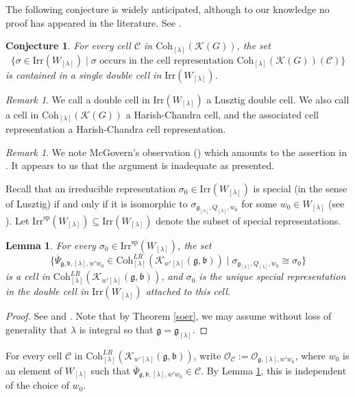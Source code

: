 \documentclass[12pt,a4paper]{amsart}
\def\subset{\subseteq}
\newcommand{\CC}{{\mathcal {C}}}
\newcommand{\CK}{{\mathcal {K}}}
\newcommand{\CO}{{\mathcal {O}}}
\newcommand{\g}{\mathfrak g}
\renewcommand{\b}{\mathfrak b}
\numberwithin{equation}{section}
\newtheorem{lem}[thm]{Lemma}
\newtheorem{conj}[thm]{Conjecture}
\theoremstyle{remark}
\newtheorem{remark}[thm]{Remark}
\def\Irr{\mathrm{Irr}}
\def\Coh{\mathrm{Coh}}
\newcommand{\Lam}{{[\lambda]}}
\begin{document}
The following conjecture is widely anticipated, although to our knowledge no proof has appeared in the literature. See \cite[page 1055]{V4}.

\begin{conj}\label{conjcell}
For every cell $\CC$ in  $ \Coh_{\Lam}( \CK(G))$, the set
\[
 \{ \sigma\in \Irr(W_\Lam)\mid \sigma\textrm{ occurs in the cell representation $\Coh_{\Lam}( \CK(G))(\CC)$}\}
\]
is contained in a single double cell in $\Irr(W_\Lam)$.
\end{conj}

\begin{remark}
We call a double cell in  $\Irr(W_\Lam)$ a Lusztig double cell. We also call a cell in  $\Coh_{\Lam}( \CK(G))$ a Harish-Chandra cell, and the associated cell representation a Harish-Chandra cell representation.
\end{remark}

\begin{remark}
We note McGovern's observation (\cite[Page 213]{Mc}) which amounts to the assertion in . It appears to us that the argument is inadequate as presented.
\end{remark}

Recall that an irreducible representation $\sigma_0\in \Irr(W_\Lam)$ is special (in the sense of Lusztig) if and only if it is isomorphic to $\sigma_{\g_\Lam,Q_\Lam,w_0}$ for some $w_0\in W_\Lam$ (see \cite[Theorem 1.1]{BV2}). Let $ \Irr^{\mathrm{sp}}(W_\Lam)\subset  \Irr(W_\Lam)$ denote the subset of special representations.


\begin{lem}\label{doublecell0}
For every $\sigma_0\in  \Irr^{\mathrm{sp}}(W_\Lam)$, the set
\[
  \{ \overline \Psi_{\g,\b, \Lam, w'w_0}\in \Coh^{LR}_{\Lam}( \CK_{ w'\Lam}(\g,\b))\mid \sigma_{\g_\Lam, Q_\Lam, w_0}\cong \sigma_0 \}
\]
is a cell in $\Coh^{LR}_{\Lam}( \CK_{ w'\Lam}(\g,\b))$, and $\sigma_0$ is the unique special representation in the double cell in $\Irr(W_\Lam)$ attached to this cell.
\end{lem}
\begin{proof}
See \cite[Theorem 2.6 and Corollary 2.16]{BV2} and  \cite[Corollary 14.11]{V4}. Note that by Theorem \ref{soer}, we may assume without loss of generality that $\lambda$ is integral so that $\g=\g_\Lam$.
\end{proof}





For every cell $\CC$ in $\Coh^{LR}_{\Lam}( \CK_{ w'\Lam}(\g,\b))$, write
$\CO_\CC:= \CO_{\g, \Lam, w' w_0}$, where $w_0$ is an element of $W_\Lam$ such that    $\overline \Psi_{\g,\b, \Lam, w'w_0}\in \CC$. By Lemma \ref{doublecell0}, this is independent of the choice of $w_0$.
\end{document}
